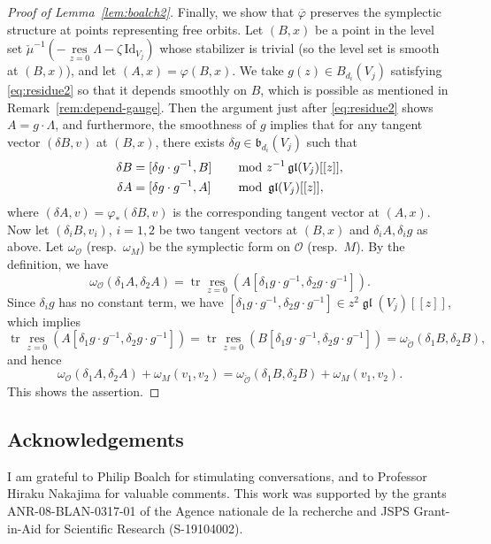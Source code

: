 \documentclass[pdftex]{sigma}
\numberwithin{equation}{section}
\theoremstyle{definition}
\newcommand{\lemref}[1]{Lemma~\ref{#1}}
\newcommand{\remref}[1]{Remark~\ref{#1}}
\newcommand{\gl}{\operatorname{\mathfrak{gl}}}
\newcommand{\frb}{\mathfrak{b}}
\newcommand{\tr}{\operatorname{tr}}
\newcommand{\unit}{\mathrm{Id}}
\newcommand{\ov}{\overline}
\newcommand{\res}{\operatorname*{res}}
\newcommand{\bO}{\mathcal{O}}
\newcommand{\hquad}{\hspace{.5em}}
\begin{document}
\begin{proof}[Proof of \lemref{lem:boalch2}]
Finally, we show that $\ov{\varphi}$ preserves the symplectic structure
at points representing free orbits.
Let $(B,x)$ be a point in
the level set $\check{\mu}^{-1}(-\res\limits_{z=0}\Lambda -\zeta\,\unit_{V_j})$
whose stabilizer is trivial (so the level set
is smooth at $(B,x)$), and let $(A,x)=\varphi(B,x)$.
We take $g(z) \in B_{d_i}(V_j)$ satisfying \eqref{eq:residue2} so that
it depends smoothly on $B$,
which is possible as mentioned in \remref{rem:depend-gauge}.
Then the argument just after \eqref{eq:residue2} shows $A=g \cdot \Lambda$,
and furthermore, the smoothness of $g$ implies that
for any tangent vector $(\delta B, v)$ at $(B,x)$,
there exists $\delta g \in \frb_{d_i}(V_j)$ such that
\begin{alignat*}{2}
\delta B &= [\delta g \cdot g^{-1}, B] &\hquad &\mod z^{-1}\gl(V_j)[[z]], \\
\delta A &= [\delta g \cdot g^{-1}, A] &\hquad &\mod \gl(V_j)[[z]],
\end{alignat*}
where $(\delta A, v)=\varphi_*(\delta B,v)$
is the corresponding tangent vector at $(A,x)$.
Now let $(\delta_i B, v_i)$, $i=1,2$ be two tangent vectors
at $(B,x)$ and $\delta_i A, \delta_i g$ as above.
Let $\omega_{\bO}$ (resp.\ $\omega_M$)
be the symplectic form
on $\bO$ (resp.\ $M$).
By the def\/inition, we have
\[
\omega_\bO(\delta_1 A,\delta_2 A)
= \tr \res_{z=0}
\left( A[\delta_1 g \cdot g^{-1}, \delta_2 g \cdot g^{-1}] \right).
\]
Since $\delta_i g$ has no constant term,
we have
$[\delta_1 g \cdot g^{-1}, \delta_2 g \cdot g^{-1}] \in z^2 \gl(V_j)[[z]]$,
which implies
\[
\tr \res_{z=0}
\left( A[\delta_1 g \cdot g^{-1}, \delta_2 g \cdot g^{-1}] \right)
= \tr \res_{z=0}
\left( B[\delta_1 g \cdot g^{-1}, \delta_2 g \cdot g^{-1}] \right)
= \omega_{\check{\bO}} (\delta_1 B, \delta_2 B),
\]
and hence
\[
\omega_{\bO}(\delta_1 A,\delta_2 A) + \omega_M(v_1,v_2)
= \omega_{\check{\bO}}(\delta_1 B,\delta_2 B) + \omega_M(v_1,v_2).
\]
This shows the assertion.
\end{proof}


\subsection*{Acknowledgements}
I am grateful to Philip Boalch for stimulating conversations,
and to Professor Hiraku Nakajima for valuable comments.
This work was supported by the grants
ANR-08-BLAN-0317-01 of the Agence nationale de la recherche
and JSPS Grant-in-Aid for Scientif\/ic Research (S-19104002).
\end{document}
